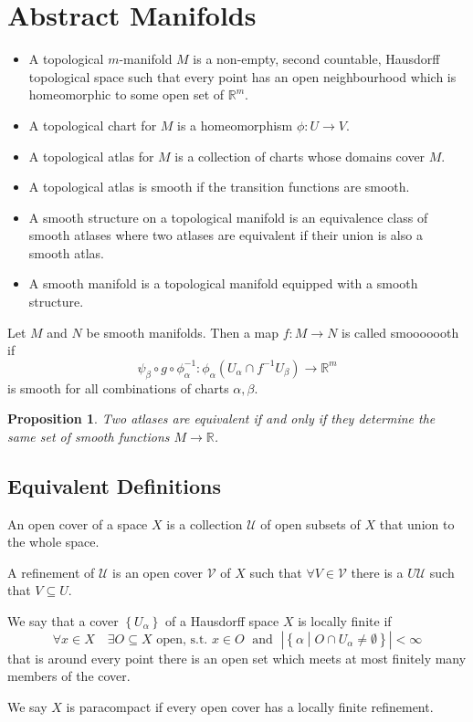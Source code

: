 \documentclass[11pt]{article}
\newcommand{\relmiddle}[1]{\mathrel{}\middle#1\mathrel{}}
\newcommand{\rmv}{\relmiddle|}
\newcommand{\R}{\mathbb{R}}
\newenvironment{defin}
	{\begin{mdframed}[backgroundcolor=white, roundcorner=5pt, linewidth=1pt, linecolor=RoyalBlue]
		\setlength{\parindent}{0pt}}
	{\end{mdframed}}
\newcommand{\mdf}[1]{{\color{RoyalBlue} #1}}
\newtheorem{prop}[theorem]{Proposition}
\begin{document}
\section{Abstract Manifolds}

\begin{defin}
	\begin{itemize}
	\item A \mdf{topological $m$-manifold} $M$ is a non-empty, second countable, Hausdorff topological space such that every point has an open neighbourhood which is homeomorphic to some open set of $\R^m$.
	\item A \mdf{topological chart} for $M$ is a homeomorphism $\phi: U \to V$.
	\item A \mdf{topological atlas} for $M$ is a collection of charts whose domains cover $M$.
	\item A topological atlas is \mdf{smooth} if the transition functions are smooth.
	\item A \mdf{smooth structure} on a topological manifold is an equivalence class of smooth atlases where two atlases are equivalent if their union is also a smooth atlas.
	\item A \mdf{smooth manifold} is a topological manifold equipped with a smooth structure.
	\end{itemize}

	Let $M$ and $N$ be smooth manifolds.
	Then a map $f : M \to N$ is called \mdf{smooooooth} if 
	\[
\psi_\beta \circ g \circ \phi_\alpha^{-1}:\phi_\alpha(U_\alpha\cap f^{-1}U_\beta)\to \R^m
	\]
	is smooth for all combinations of charts $\alpha, \beta$.
\end{defin}

\begin{prop}
Two atlases are equivalent if and only if they determine the same set of smooth functions $M\to \R$.
\end{prop}

\subsection{Equivalent Definitions}
\begin{defin}
An \mdf{open cover} of a space $X$ is a collection $\mathcal{U}$ of open subsets of $X$ that union to the whole space.

A \mdf{refinement} of $\mathcal{U}$ is an open cover $\mathcal{V}$ of $X$ such that $\forall V\in \mathcal{V}$ there is a $U\mathcal{U}$ such that $V\subseteq U$.

We say that a cover $\left\{ U_\alpha\right\}$ of a Hausdorff space $X$ is \mdf{locally finite} if
\[
	\forall x \in X \quad \exists O\subseteq X\text{ open, s.t. }x\in O \; \text{ and } \; \left|\left\{ \alpha \rmv O\cap U_\alpha\neq\emptyset\right\}\right|< \infty
\]
that is around every point there is an open set which meets at most finitely many members of the cover.

We say $X$ is \mdf{paracompact} if every open cover has a locally finite refinement.
\end{defin}
\end{document}
